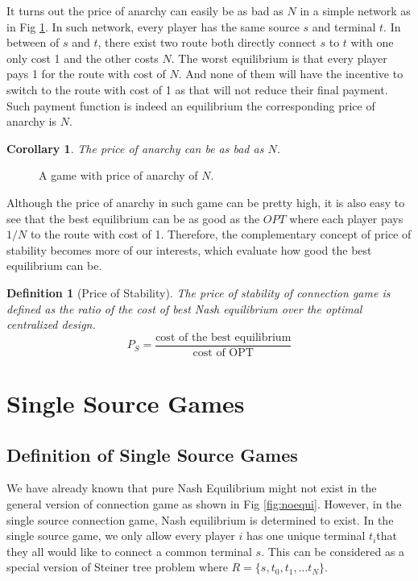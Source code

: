 \documentclass[11pt,psfig,times]{article}
\newtheorem{corollary}{Corollary}[section]
\newtheorem{definition}{Definition}[section]
\begin{document}
It turns out the price of anarchy can easily be as bad as $N$ in a simple network as in Fig \ref{fig:anarchyN}. In such network, every player has the same source $s$ and terminal $t$. In between of $s$ and $t$, there exist two route both directly connect $s$ to $t$ with one only cost 1 and the other costs $N$. The worst equilibrium is that every player pays 1 for the route with cost of $N$. And none of them will have the incentive to switch to the route with cost of 1 as that will not reduce their final payment. Such payment function is indeed an equilibrium the corresponding price of anarchy is $N$.
\begin{corollary}
The price of anarchy can be as bad as \(N\).
\end{corollary}

\begin{figure}[H]
	\begin{center}
	\end{center}
	\caption{A game with price of anarchy of $N$.}
	\label{fig:anarchyN}
\end{figure}

Although the price of anarchy in such game can be pretty high, it is also easy to see that the best equilibrium can be as good as the $OPT$ where each player pays $1/N$ to the route with cost of 1. Therefore, the complementary concept of price of stability becomes more of our interests, which evaluate how good the best equilibrium can be.
\begin{definition}[Price of Stability] The price of stability of connection game is defined as the ratio of the cost of best Nash equilibrium over the optimal centralized design.
	\[P_S = \dfrac{\text{cost of the best equilibrium} }{\text{cost of OPT}}\]
\end{definition}

\section{Single Source Games}
\subsection{Definition of Single Source Games}
We have already known that pure Nash Equilibrium might not exist in the general version of connection game as shown in Fig \ref{fig:noequi}. However, in the single source connection game, Nash equilibrium is determined to exist. In the single source game, we only allow every player \(i\) has one unique terminal \(t_i\)that they all would like to connect a common terminal \(s\). This can be considered as a special version of Steiner tree problem where \(R = \{s,t_0,t_1,...t_N\}\). 
\end{document}
